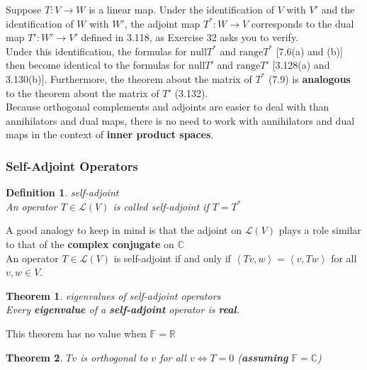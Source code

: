 \documentclass{article}
\newtheorem{theorem}{Theorem}[subsection]
\newtheorem{definition}{Definition}[subsection]
\newcommand{\RR}{\mathbb{R}}
\newcommand{\CC}{\mathbb{C}}
\newcommand{\FF}{\mathbb{F}}
\newcommand{\range}{\text{range}}
\newcommand{\n}{\text{null}}
\begin{document}
\begin{CJK}{UTF8}{gkai}
Suppose $T: V \to W$ is a linear map. Under the identification of $V$ with $V'$ and the identification of $W$ with $W'$, the adjoint map $T^\ast: W \to V$ corresponds to the dual map $T': W' \to V'$ defined in 3.118, as Exercise 32 asks you to verify.\\

Under this identification, the formulas for $\n T^\ast$ and $\range T^\ast$ [7.6(a) and (b)] then become identical to the formulas for $\n  T'$ and $\range T'$ [3.128(a) and 3.130(b)]. Furthermore, the theorem about the matrix of $T^\ast$ (7.9) is \textbf{analogous} to the theorem about the matrix of $T'$ (3.132).\\

Because orthogonal complements and adjoints are easier to deal with than annihilators and dual maps, there is no need to work with annihilators and dual maps in the context of \textbf{inner product spaces}.\\

\subsubsection{Self-Adjoint Operators}

\begin{definition}
    self-adjoint\\
    
    An operator $T \in \mathcal{L}(V)$ is called self-adjoint if $T = T^\ast$
\end{definition}

A good analogy to keep in mind is that the adjoint on $\mathcal{L}(V)$ plays a role similar to that of the \textbf{complex conjugate} on $\CC$\\

An operator $T \in \mathcal{L}(V)$ is self-adjoint if and only if $\left<Tv,w\right> = \left<v,Tw\right>$ for all $v,w \in V$.\\

\begin{theorem}
    eigenvalues of self-adjoint operators\\

    Every \textbf{eigenvalue} of a \textbf{self-adjoint} operator is \textbf{real}.
\end{theorem}

This theorem has no value when $\FF = \RR$

\begin{theorem}
    $Tv$ is orthogonal to $v$ for all $v \Leftrightarrow T = 0$ (\textbf{assuming} $\FF = \CC$)\\


\end{theorem}
\end{CJK}
\end{document}
